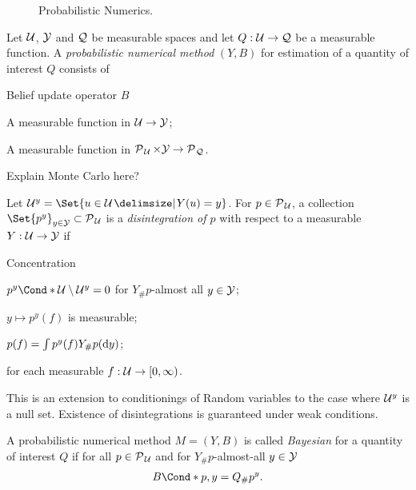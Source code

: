 \begin{figure}[t]
    \centering
    
    \caption[Probabilistic Numerics]{
        Probabilistic Numerics.
        \label{fig:probabilistic_numerics}
    }
\end{figure}
\begin{definition}
    \label{def:probabilistic_numerical_method}
    Let $\mathcal{U}$, $\mathcal{Y}$ and $\mathcal{Q}$ be measurable spaces and let $Q: \mathcal{U} \to \mathcal{Q}$ be a measurable function.
    A \emph{probabilistic numerical method} $(Y, B)$ for estimation of a quantity of interest $Q$ consists of
    \begin{labeling}{Belief update operator $B$\quad}
        \item[Information operator $Y$] A measurable function in $\mathcal{U} \to \mathcal{Y}$;
        \item[Belief update operator $B$] A measurable function in $\operatorname{\mathcal{P}\mkern1mu}_{\mathcal{U}} \times \mathcal{Y} \to \operatorname{\mathcal{P}\mkern1mu}_{\mathcal{Q}}$.
    \end{labeling}
\end{definition}

Explain Monte Carlo here?

\begin{definition}[Disintegration]
    Let $\Uc^y = \Set{u \in \Uc \with Y(u) = y}$.
    For $p \in \operatorname{\mathcal{P}\mkern1mu}_{\mathcal{U}}$, a collection $\Set{p^y}_{y \in \Yc} \subset \Probs{\Uc}$ is a \emph{disintegration of $p$} with respect to a measurable $Y: \mathcal{U} \to \mathcal{Y}$ if
    \begin{labeling}{Concentration\quad}
        \item[Concentration] $\Fun*{p^y}{\Uc \setminus \Uc^y} = 0$ for $Y_\#p$-almost all $y \in \mathcal{Y}$;
        \item[Measurability] $y \mapsto p^y(f)$ is measurable;
        \item[Conditioning] $p(f) = \int p^y(f) Y_\#p(\mathop{}\!\mathrm{d} y)$;
    \end{labeling}
    for each measurable $f : \mathcal{U} \to [0, \infty)$.
\end{definition}
This is an extension to conditionings of Random variables to the case where $\mathcal{U}^y$ is a null set.
Existence of disintegrations is guaranteed under weak conditions.

\begin{definition}
    \label{def:bayesian_probabilistic_numerical_method}
    A probabilistic numerical method $M = (Y, B)$ is called \emph{Bayesian} for a quantity of interest $Q$ if for all $p \in \operatorname{\mathcal{P}\mkern1mu}_{\mathcal{U}}$ and for $Y_\#p$-almost-all $y \in \mathcal{Y}$
    \begin{align}
        \Fun*{B}{p, y} = Q_\#p^y.
    \end{align}
\end{definition}

